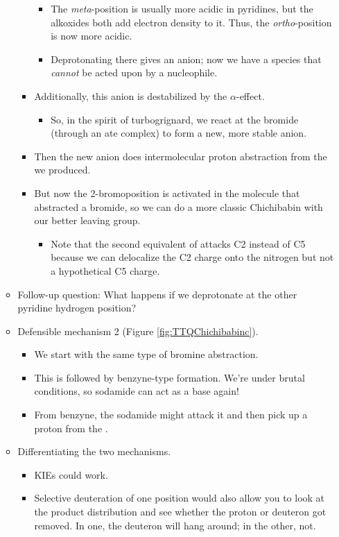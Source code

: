 \documentclass[../notes.tex]{subfiles}
\begin{document}
\begin{itemize}
\begin{itemize}
\begin{itemize}
\begin{itemize}
                \item The \emph{meta}-position is usually more acidic in pyridines, but the alkoxides both add electron density to it. Thus, the \emph{ortho}-position is now more acidic.
                \item Deprotonating there gives an anion; now we have a species that \emph{cannot} be acted upon by a nucleophile.
            \end{itemize}
            \item Additionally, this anion is destabilized by the $\alpha$-effect.
            \begin{itemize}
                \item So, in the spirit of turbogrignard, we react at the bromide (through an ate complex) to form a new, more stable anion.
            \end{itemize}
            \item Then the new anion does intermolecular proton abstraction from the  we produced.
            \item But now the 2-bromoposition is activated in the molecule that abstracted a bromide, so we can do a more classic Chichibabin with our better leaving group.
            \begin{itemize}
                \item Note that the second equivalent of  attacks C2 instead of C5 because we can delocalize the C2 charge onto the nitrogen but not a hypothetical C5 charge.
            \end{itemize}
        \end{itemize}
        \item Follow-up question: What happens if we deprotonate at the other pyridine hydrogen position?
        \item Defensible mechanism 2 (Figure \ref{fig:TTQChichibabinc}).
        \begin{itemize}
            \item We start with the same type of bromine abstraction.
            \item This is followed by benzyne-type formation. We're under brutal conditions, so sodamide can act as a base again!
            \item From benzyne, the sodamide might attack it and then pick up a proton from the .
        \end{itemize}
        \item Differentiating the two mechanisms.
        \begin{itemize}
            \item KIEs could work.
            \item Selective deuteration of one position would also allow you to look at the product distribution and see whether the proton or deuteron got removed. In one, the deuteron will hang around; in the other, not.
        \end{itemize}
    \end{itemize}
\end{itemize}
\end{document}
